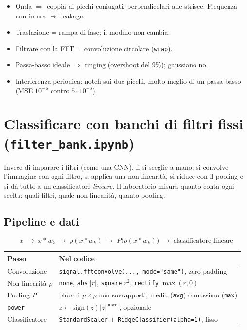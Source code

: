 \documentclass[11pt,a4paper]{article}
\newcommand{\code}[1]{\texttt{#1}}
\begin{document}
\begin{esame}
\begin{itemize}[leftmargin=*]
  \item Onda $\Rightarrow$ coppia di picchi coniugati, perpendicolari alle strisce. Frequenza non intera $\Rightarrow$ leakage.
  \item Traslazione = rampa di fase; il modulo non cambia.
  \item Filtrare con la FFT = convoluzione circolare (\code{wrap}).
  \item Passa-basso ideale $\Rightarrow$ ringing (overshoot del 9\%); gaussiano no.
  \item Interferenza periodica: notch sui due picchi, molto meglio di un passa-basso (MSE $10^{-6}$ contro $5 \cdot 10^{-3}$).
\end{itemize}
\end{esame}

\newpage
\section{Classificare con banchi di filtri fissi (\code{filter\_bank.ipynb})}

\begin{idea}
Invece di imparare i filtri (come una CNN), li si sceglie a mano: si convolve l'immagine con ogni filtro, si applica una non linearità, si riduce con il pooling e si dà tutto a un classificatore \emph{lineare}. Il laboratorio misura quanto conta ogni scelta: quali filtri, quale non linearità, quanto pooling.
\end{idea}

\subsection{Pipeline e dati}

\[
x \;\longrightarrow\; x * w_k \;\longrightarrow\; \rho(x * w_k) \;\longrightarrow\; P\big(\rho(x * w_k)\big) \;\longrightarrow\; \text{classificatore lineare}
\]

\begin{center}
\begin{tabular}{@{}lp{10.5cm}@{}}
\toprule
Passo & Nel codice \\
\midrule
Convoluzione & \code{signal.fftconvolve(..., mode="same")}, zero padding \\
Non linearità $\rho$ & \code{none}, \code{abs} $|r|$, \code{square} $r^2$, \code{rectify} $\max(r,0)$ \\
Pooling $P$ & blocchi $p \times p$ non sovrapposti, media (\code{avg}) o massimo (\code{max}) \\
\code{power} & $z \leftarrow \text{sign}(z)|z|^{\text{power}}$, opzionale \\
Classificatore & \code{StandardScaler} + \code{RidgeClassifier(alpha=1)}, fisso \\
\bottomrule
\end{tabular}
\end{center}
\end{document}
